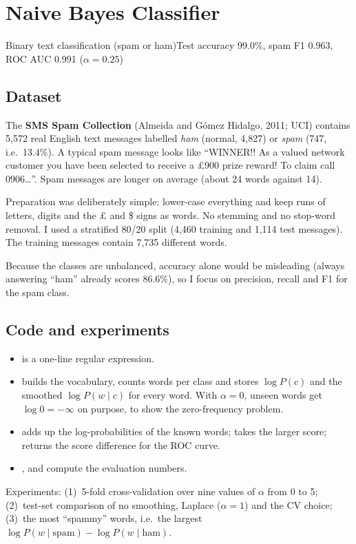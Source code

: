 \chapter{Naive Bayes Classifier}

{Binary text classification (spam or ham)}{Test accuracy 99.0\%, spam F1 0.963, ROC AUC 0.991 ($\alpha=0.25$)}

\section{Dataset}
The \textbf{SMS Spam Collection} (Almeida and Gómez Hidalgo, 2011; UCI) contains 5,572 real English text
messages labelled \emph{ham} (normal, 4,827) or \emph{spam} (747, i.e.\ 13.4\%). A typical spam message
looks like ``WINNER!! As a valued network customer you have been selected to receive a £900 prize
reward! To claim call 0906\dots''. Spam messages are longer on average (about 24 words against 14).

Preparation was deliberately simple: lower-case everything and keep runs of letters, digits and the
\pounds{} and \$ signs as words. No stemming and no stop-word removal. I used a stratified 80/20 split
(4,460 training and 1,114 test messages). The training messages contain 7,735 different words.

Because the classes are unbalanced, accuracy alone would be misleading (always answering ``ham'' already
scores 86.6\%), so I focus on precision, recall and F1 for the spam class.

\section{Code and experiments}
\begin{itemize}
\item {} is a one-line regular expression.
\item {} builds the vocabulary, counts words per class and stores
      $\log P(c)$ and the smoothed $\log P(w\mid c)$ for every word. With $\alpha=0$, unseen words get
      $\log 0=-\infty$ on purpose, to show the zero-frequency problem.
\item {} adds up the log-probabilities of the known words;  takes the
      larger score;  returns the score difference for the ROC curve.
\item {},  and  compute the evaluation numbers.
\end{itemize}
\noindent Experiments: (1)~5-fold cross-validation over nine values of $\alpha$ from 0 to 5; (2)~test-set
comparison of no smoothing, Laplace ($\alpha=1$) and the CV choice; (3)~the most ``spammy'' words, i.e.\
the largest $\log P(w\mid\text{spam})-\log P(w\mid\text{ham})$.

